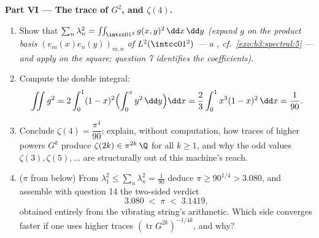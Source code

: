 \begin{problem}
\medskip
\noindent\textbf{Part VI --- The trace of $G^2$, and
$\zeta(4)$.}
\begin{enumerate}[resume]
  \item Show that $\sum_n\lambda_n^2 =
        \iint_{\intcc01^2}g(x,y)^2\,\dd x\,\dd y$
        \emph{(expand $g$ on the product basis
        $(e_m(x)e_n(y))_{m,n}$ of $L^2(\intcc01^2)$ --- a
        , cf.\ \cref{exo:b3:spectral:5} --- and
        apply  on the square; question 7 identifies
        the coefficients)}.
  \item Compute the double integral:
        \[
        \iint g^2 = 2\int_0^1(1-x)^2\Bigl(\int_0^x
        y^2\,\dd y\Bigr)\dd x
        = \frac23\int_0^1x^3(1-x)^2\,\dd x = \frac1{90} .
        \]
  \item Conclude $\zeta(4) = \dfrac{\pi^4}{90}$; explain,
        without computation, how traces of higher powers
        $G^k$ produce $\zeta(2k) \in \pi^{2k}\,\Q$ for all
        $k \geq 1$, and why the odd values $\zeta(3),
        \zeta(5), \dots$ are structurally out of this
        machine's reach.
  \item ($\pi$ from below) From $\lambda_1^2 \leq
        \sum_n\lambda_n^2 = \frac1{90}$ deduce $\pi \geq
        90^{1/4} > 3.080$, and assemble with question 14 the
        two-sided verdict
        \[
        3.080 \;<\; \pi \;<\; 3.1419,
        \]
        obtained entirely from the vibrating string's
        arithmetic. Which side converges faster if one uses
        higher traces $(\operatorname{tr}G^{2k})^{-1/4k}$,
        and why?
\end{enumerate}


\end{problem}
